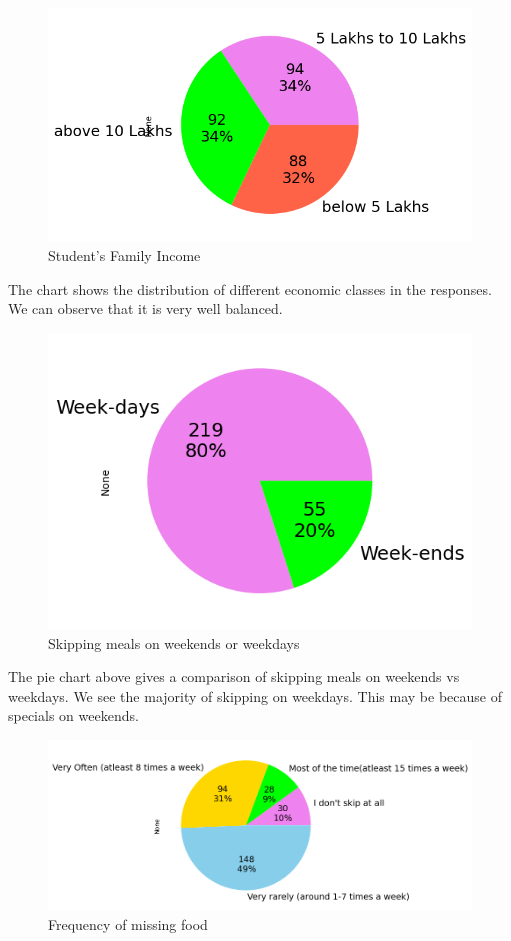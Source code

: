 \documentclass{article}
\begin{document}
\begin{figure}[H]
    \centering
    \includegraphics[scale = 0.9]{pie_income.png}
    \caption{Student's Family Income}  
    \label{fig:pie_income}
\end{figure}
The chart shows the distribution of different economic classes in the responses. We can observe that it is very well balanced.
\begin{figure}[H]
    \centering
    \includegraphics[scale = 0.9]{pie_plot_weekdays.png}
    \caption{Skipping meals on weekends or weekdays}  
    \label{fig:pie_plot_weekdays}
\end{figure}
The pie chart above gives a comparison of skipping meals on weekends vs weekdays. We see the majority of skipping on weekdays. This may be because of specials on weekends.
\begin{figure}[H]
    \centering
    \includegraphics[scale = 0.75]{pie_skip_categoty.png}
    \caption{Frequency of missing food}  
    \label{fig:pie_skip_categoty}
\end{figure}
\end{document}
